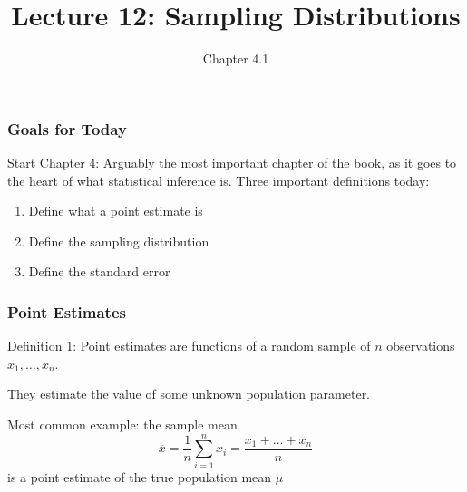 \documentclass[handout]{beamer}
\title{Lecture 12: Sampling Distributions}
\author{Chapter 4.1}
\date{}
\newcommand{\blue}[1]{\textcolor{blue2}{#1}}
\newcommand{\xbar}{\overline{x}}
\begin{document}
\begin{frame}
\titlepage
\end{frame}


\begin{frame}[fragile]
\frametitle{Goals for Today}

Start Chapter 4:  Arguably the most important chapter of the book, as it goes to the heart of what statistical inference is.  Three important definitions today:

\vspace{0.5cm}

\begin{enumerate}
\item Define what a \blue{point estimate} is
\item Define the \blue{sampling distribution}
\item Define the \blue{standard error}
\end{enumerate}


\end{frame}


\begin{frame}[fragile]
\frametitle{Point Estimates}

Definition 1: \blue{Point estimates} are functions of a random sample of $n$ observations $x_1, \ldots, x_n$.  

\pause\vspace{0.5cm}

They estimate the value of some unknown population parameter.

\pause\vspace{0.5cm}

Most common example:  the sample mean 
\[
\xbar=\frac{1}{n}\sum_{i=1}^{n}x_i = \frac{x_1 + \ldots + x_n}{n}
\] 
is a point estimate of the true population mean $\mu$


\end{frame}
\end{document}
